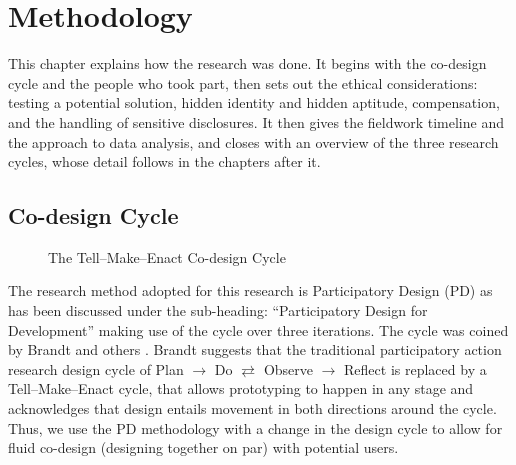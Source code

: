 \chapter{Methodology}

\begin{chapterintro}
This chapter explains how the research was done. It begins with the \tme{} co-design cycle and the people who took part, then sets out the ethical considerations: testing a potential solution, hidden identity and hidden aptitude, compensation, and the handling of sensitive disclosures. It then gives the fieldwork timeline and the approach to data analysis, and closes with an overview of the three research cycles, whose detail follows in the chapters after it.
\end{chapterintro}

\section{\texorpdfstring{\tme}{Tell-Make-Enact} Co-design Cycle}

\begin{figure}[h]
\centering
{}
\caption{The Tell--Make--Enact Co-design Cycle}
\label{fig:tell-make-enact}
\end{figure}



The research method adopted for this research is Participatory Design (PD) as has been discussed under the sub-heading: “Participatory Design for Development” making use of the \tme{} cycle over three iterations. The cycle was coined by Brandt and others \cite{simonsen2013}. Brandt suggests that the traditional participatory action research design cycle of Plan $\rightarrow$ Do $\rightleftarrows$ Observe $\rightarrow$ Reflect is replaced by a Tell--Make--Enact cycle,
that allows prototyping to happen in any stage and acknowledges that design entails movement in both directions around the cycle. Thus, we use the PD methodology with a change in the design cycle to allow for fluid co-design (designing together on par) with potential users.


